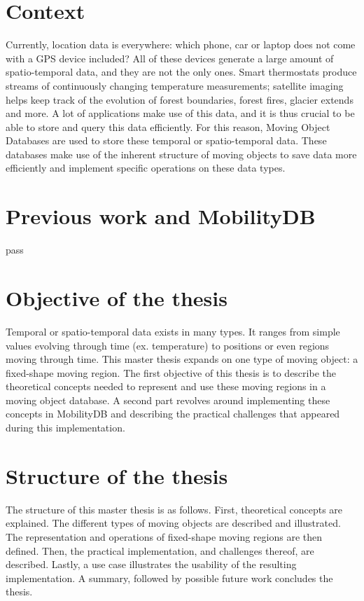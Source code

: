 \section{Context}

Currently, location data is everywhere: which phone, car or laptop does not come with a GPS device included? All of these devices generate a large amount of spatio-temporal data, and they are not the only ones. 
Smart thermostats produce streams of continuously changing temperature measurements; satellite imaging helps keep track of the evolution of forest boundaries, forest fires, glacier extends and more. 
A lot of applications make use of this data, and it is thus crucial to be able to store and query this data efficiently. For this reason, Moving Object Databases are used to store these temporal or spatio-temporal data. These databases make use of the inherent structure of moving objects to save data more efficiently and implement specific operations on these data types.

\section{Previous work and MobilityDB}

pass

\section{Objective of the thesis}

Temporal or spatio-temporal data exists in many types. It ranges from simple values evolving through time (ex. temperature) to positions or even regions moving through time. This master thesis expands on one type of moving object: a fixed-shape moving region. The first objective of this thesis is to describe the theoretical concepts needed to represent and use these moving regions in a moving object database. A second part revolves around implementing these concepts in MobilityDB and describing the practical challenges that appeared during this implementation.

\section{Structure of the thesis}

The structure of this master thesis is as follows. First, theoretical concepts are explained. The different types of moving objects are described and illustrated. The representation and operations of fixed-shape moving regions are then defined. Then, the practical implementation, and challenges thereof, are described. Lastly, a use case illustrates the usability of the resulting implementation. A summary, followed by possible future work concludes the thesis.